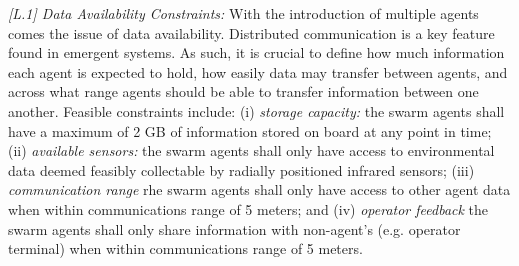 \documentclass[runningheads]{llncs}
\begin{document}
\emph{[L.1] Data Availability Constraints:}
With the introduction of multiple agents comes the issue of data availability. Distributed communication is a key feature found in emergent systems. As such, it is crucial to define how much information each agent is expected to hold, how easily data may transfer between agents, and across what range agents should be able to transfer information between one another. Feasible constraints include: (i) \emph{storage capacity: }the swarm agents shall have a maximum of 2 GB of information stored on board at any point in time; (ii) \emph{available sensors:} the swarm agents shall only have access to environmental data deemed feasibly collectable by radially positioned infrared sensors; (iii) \emph{communication range} rhe swarm agents shall only have access to other agent data when within communications range of 5 meters; and (iv) \emph{operator feedback} the swarm agents shall only share information with non-agent’s (e.g. operator terminal) when within communications range of 5 meters.




\end{document}

